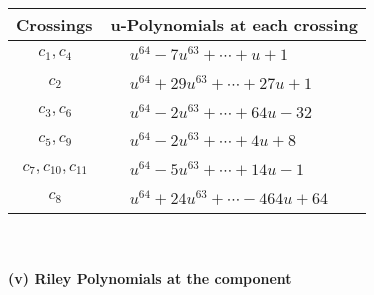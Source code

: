 \documentclass[1p]{elsarticle_modified}
\theoremstyle{definition}
\begin{document}
\begin{tabular}{m{50pt}|m{274pt}}
Crossings & \hspace{64pt}u-Polynomials at each crossing \\
\hline $$\begin{aligned}c_{1},c_{4}\end{aligned}$$&$\begin{aligned}
&u^{64}-7 u^{63}+\cdots+u+1
\end{aligned}$\\
\hline $$\begin{aligned}c_{2}\end{aligned}$$&$\begin{aligned}
&u^{64}+29 u^{63}+\cdots+27 u+1
\end{aligned}$\\
\hline $$\begin{aligned}c_{3},c_{6}\end{aligned}$$&$\begin{aligned}
&u^{64}-2 u^{63}+\cdots+64 u-32
\end{aligned}$\\
\hline $$\begin{aligned}c_{5},c_{9}\end{aligned}$$&$\begin{aligned}
&u^{64}-2 u^{63}+\cdots+4 u+8
\end{aligned}$\\
\hline $$\begin{aligned}c_{7},c_{10},c_{11}\end{aligned}$$&$\begin{aligned}
&u^{64}-5 u^{63}+\cdots+14 u-1
\end{aligned}$\\
\hline $$\begin{aligned}c_{8}\end{aligned}$$&$\begin{aligned}
&u^{64}+24 u^{63}+\cdots-464 u+64
\end{aligned}$\\
\hline
\end{tabular}\\~\\
\newpage\renewcommand{\arraystretch}{1}
\flushleft \textbf{(v) Riley Polynomials at the component}\newline \\
\end{document}
